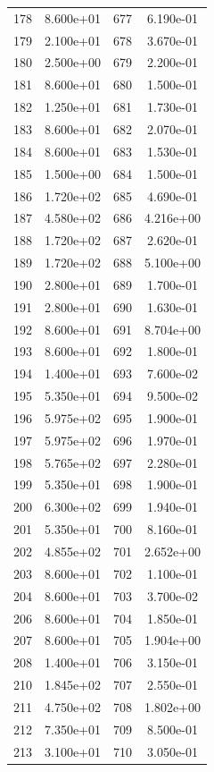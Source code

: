 \documentclass[12pt]{article}
\begin{document}
\begin{longtable}{@{}cccc@{}}
178 & 8.600e+01 & 677 & 6.190e-01 \\
179 & 2.100e+01 & 678 & 3.670e-01 \\
180 & 2.500e+00 & 679 & 2.200e-01 \\
181 & 8.600e+01 & 680 & 1.500e-01 \\
182 & 1.250e+01 & 681 & 1.730e-01 \\
183 & 8.600e+01 & 682 & 2.070e-01 \\
184 & 8.600e+01 & 683 & 1.530e-01 \\
185 & 1.500e+00 & 684 & 1.500e-01 \\
186 & 1.720e+02 & 685 & 4.690e-01 \\
187 & 4.580e+02 & 686 & 4.216e+00 \\
188 & 1.720e+02 & 687 & 2.620e-01 \\
189 & 1.720e+02 & 688 & 5.100e+00 \\
190 & 2.800e+01 & 689 & 1.700e-01 \\
191 & 2.800e+01 & 690 & 1.630e-01 \\
192 & 8.600e+01 & 691 & 8.704e+00 \\
193 & 8.600e+01 & 692 & 1.800e-01 \\
194 & 1.400e+01 & 693 & 7.600e-02 \\
195 & 5.350e+01 & 694 & 9.500e-02 \\
196 & 5.975e+02 & 695 & 1.900e-01 \\
197 & 5.975e+02 & 696 & 1.970e-01 \\
198 & 5.765e+02 & 697 & 2.280e-01 \\
199 & 5.350e+01 & 698 & 1.900e-01 \\
200 & 6.300e+02 & 699 & 1.940e-01 \\
201 & 5.350e+01 & 700 & 8.160e-01 \\
202 & 4.855e+02 & 701 & 2.652e+00 \\
203 & 8.600e+01 & 702 & 1.100e-01 \\
204 & 8.600e+01 & 703 & 3.700e-02 \\
206 & 8.600e+01 & 704 & 1.850e-01 \\
207 & 8.600e+01 & 705 & 1.904e+00 \\
208 & 1.400e+01 & 706 & 3.150e-01 \\
210 & 1.845e+02 & 707 & 2.550e-01 \\
211 & 4.750e+02 & 708 & 1.802e+00 \\
212 & 7.350e+01 & 709 & 8.500e-01 \\
213 & 3.100e+01 & 710 & 3.050e-01 \\

\end{longtable}
\end{document}
